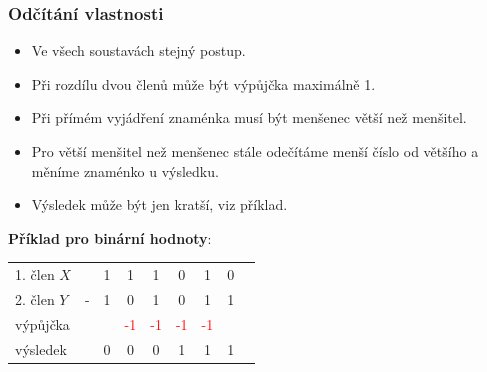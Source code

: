 	\begin{frame}
    \frametitle{Odčítání vlastnosti}
		\boldmath
    
    \begin{itemize}
      \item Ve všech soustavách stejný postup.
      \item Při rozdílu dvou členů může být výpůjčka maximálně 1.
      \item Při přímém vyjádření znaménka musí být menšenec větší než menšitel.
      \item Pro větší menšitel než menšenec stále odečítáme menší číslo od většího a měníme znaménko u výsledku.
      \item Výsledek může být jen kratší, viz příklad.
    \end{itemize}
    
    \vspace{4mm}
    \textbf{Příklad pro binární hodnoty}:
    \vspace{2mm}
      
    \boldmath
    \begin{center}
      \begin{tabular}{ p{20mm} c c c c c c c c}
        1. člen $X$  &   & 1 & 1 & 1 & 0 & 1 & 0 \\
        2. člen $Y$  & - & 1 & 0 & 1 & 0 & 1 & 1 \\
        výpůjčka     &   &   & \textcolor{red}{-1}  & \textcolor{red}{-1} & \textcolor{red}{-1}  & \textcolor{red}{-1}  &   \\
        \hline
        výsledek     &   & 0 & 0 & 0 & 1 & 1 & 1 \\
      \end{tabular}
    \end{center}
    
	\end{frame}